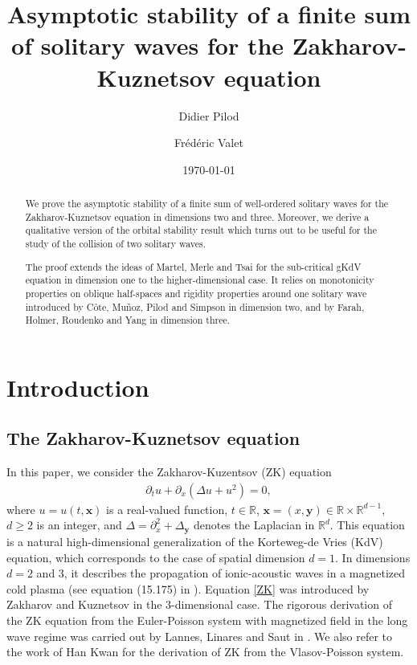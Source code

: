 \documentclass[reqno,10pt]{amsart}
\title[Asymptotic stability of a finite sum of solitary waves for the ZK equation]{Asymptotic stability of a finite sum of solitary waves for the Zakharov-Kuznetsov equation}
\author[D. Pilod]{Didier Pilod}
\author[F. Valet]{Fr\'ed\'eric Valet}
\date{\today}
\numberwithin{equation}{section}
\newcommand{\bx}{\mathbf{x}}
\newcommand{\by}{\mathbf{y}}
\begin{document}
	
	\maketitle
	
	\begin{abstract}
		We prove the asymptotic stability of a finite sum of well-ordered solitary waves for the Zakharov-Kuznetsov equation in dimensions two and three. Moreover, we derive a qualitative version of the orbital stability result which turns out to be useful for the study of the collision of two solitary waves.  
		
		The proof extends the ideas of Martel, Merle and Tsai for the sub-critical gKdV equation in dimension one to the higher-dimensional case. It relies on  monotonicity properties on oblique half-spaces and rigidity properties around one solitary wave introduced by C\^ote, Mu\~noz, Pilod and Simpson in dimension two, and by Farah, Holmer, Roudenko and Yang in dimension three.
	\end{abstract}
	
	\section{Introduction}
	
	\subsection{The Zakharov-Kuznetsov equation}
	In this paper, we consider the Zakharov-Kuzentsov (ZK) equation
	\begin{align}\label{ZK}%
		\partial_t u + \partial_x \left( \Delta u + u^2 \right)=0, 
	\end{align}
	where $u=u(t,\bx)$ is a real-valued function, $t \in \mathbb R$, $\bx =(x,\by) \in \mathbb R \times \mathbb R^{d-1}$, $d \ge 2$ is an integer, and $\Delta=\partial_x^2+\Delta_{\by}$ denotes the Laplacian in $\mathbb R^d$. This equation is a natural high-dimensional generalization of the Korteweg-de Vries (KdV) equation, which corresponds to the case of spatial dimension $d=1$. In dimensions $d=2$ and $3$, it describes the propagation of ionic-acoustic waves in a magnetized cold plasma (see  equation (15.175) in \cite{Bellan}). Equation \eqref{ZK} was introduced by Zakharov and Kuznetsov \cite{ZK} in the $3$-dimensional case. The rigorous derivation of the ZK equation from the Euler-Poisson system with magnetized field in the long wave regime was carried out by Lannes, Linares and Saut in \cite{LaLiSa}. We also refer to the work of Han Kwan \cite{HanKwan} for the derivation of ZK from the Vlasov-Poisson system. 
	
\end{document}
